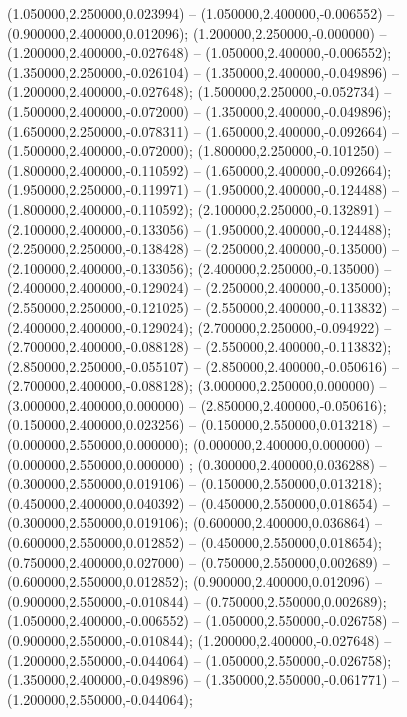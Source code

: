 (1.050000,2.250000,0.023994) -- (1.050000,2.400000,-0.006552) -- (0.900000,2.400000,0.012096);
 (1.200000,2.250000,-0.000000) -- (1.200000,2.400000,-0.027648) -- (1.050000,2.400000,-0.006552);
 (1.350000,2.250000,-0.026104) -- (1.350000,2.400000,-0.049896) -- (1.200000,2.400000,-0.027648);
 (1.500000,2.250000,-0.052734) -- (1.500000,2.400000,-0.072000) -- (1.350000,2.400000,-0.049896);
 (1.650000,2.250000,-0.078311) -- (1.650000,2.400000,-0.092664) -- (1.500000,2.400000,-0.072000);
 (1.800000,2.250000,-0.101250) -- (1.800000,2.400000,-0.110592) -- (1.650000,2.400000,-0.092664);
 (1.950000,2.250000,-0.119971) -- (1.950000,2.400000,-0.124488) -- (1.800000,2.400000,-0.110592);
 (2.100000,2.250000,-0.132891) -- (2.100000,2.400000,-0.133056) -- (1.950000,2.400000,-0.124488);
 (2.250000,2.250000,-0.138428) -- (2.250000,2.400000,-0.135000) -- (2.100000,2.400000,-0.133056);
 (2.400000,2.250000,-0.135000) -- (2.400000,2.400000,-0.129024) -- (2.250000,2.400000,-0.135000);
 (2.550000,2.250000,-0.121025) -- (2.550000,2.400000,-0.113832) -- (2.400000,2.400000,-0.129024);
 (2.700000,2.250000,-0.094922) -- (2.700000,2.400000,-0.088128) -- (2.550000,2.400000,-0.113832);
 (2.850000,2.250000,-0.055107) -- (2.850000,2.400000,-0.050616) -- (2.700000,2.400000,-0.088128);
 (3.000000,2.250000,0.000000) -- (3.000000,2.400000,0.000000) -- (2.850000,2.400000,-0.050616);
 (0.150000,2.400000,0.023256) -- (0.150000,2.550000,0.013218) -- (0.000000,2.550000,0.000000);
 (0.000000,2.400000,0.000000) -- (0.000000,2.550000,0.000000) ;
 (0.300000,2.400000,0.036288) -- (0.300000,2.550000,0.019106) -- (0.150000,2.550000,0.013218);
 (0.450000,2.400000,0.040392) -- (0.450000,2.550000,0.018654) -- (0.300000,2.550000,0.019106);
 (0.600000,2.400000,0.036864) -- (0.600000,2.550000,0.012852) -- (0.450000,2.550000,0.018654);
 (0.750000,2.400000,0.027000) -- (0.750000,2.550000,0.002689) -- (0.600000,2.550000,0.012852);
 (0.900000,2.400000,0.012096) -- (0.900000,2.550000,-0.010844) -- (0.750000,2.550000,0.002689);
 (1.050000,2.400000,-0.006552) -- (1.050000,2.550000,-0.026758) -- (0.900000,2.550000,-0.010844);
 (1.200000,2.400000,-0.027648) -- (1.200000,2.550000,-0.044064) -- (1.050000,2.550000,-0.026758);
 (1.350000,2.400000,-0.049896) -- (1.350000,2.550000,-0.061771) -- (1.200000,2.550000,-0.044064);
